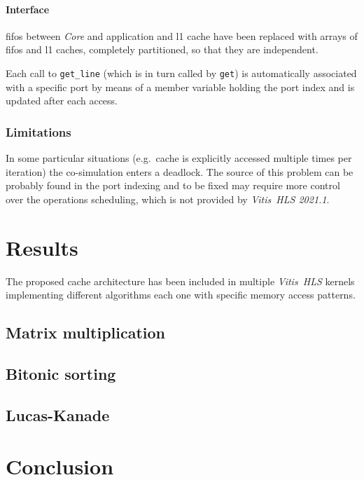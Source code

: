 \documentclass[11pt,a4paper,oneside]{memoir}
\begin{document}
\subsubsection{Interface}
\acp{fifo} between \emph{Core} and application and \ac{l1} cache have been
replaced with arrays of \acp{fifo} and \ac{l1} caches, completely partitioned,
so that they are independent.

Each call to \texttt{get\_line} (which is in turn called by \texttt{get}) is
automatically associated with a specific port by means of a member variable
holding the port index and is updated after each access.

\subsection{Limitations}
In some particular situations (e.g.\ cache is explicitly accessed multiple times
per iteration) the co-simulation enters a deadlock.
The source of this problem can be probably found in the port indexing and to be
fixed may require more control over the operations scheduling, which is not
provided by \emph{Vitis\texttrademark~HLS 2021.1}.

\chapter{Results}
The proposed cache architecture has been included in multiple \emph{Vitis~HLS}
kernels implementing different algorithms each one with specific memory access
patterns.
\section{Matrix multiplication}
\section{Bitonic sorting}
\section{Lucas-Kanade}

\chapter{Conclusion}

\backmatter

\printbibliography
\end{document}
